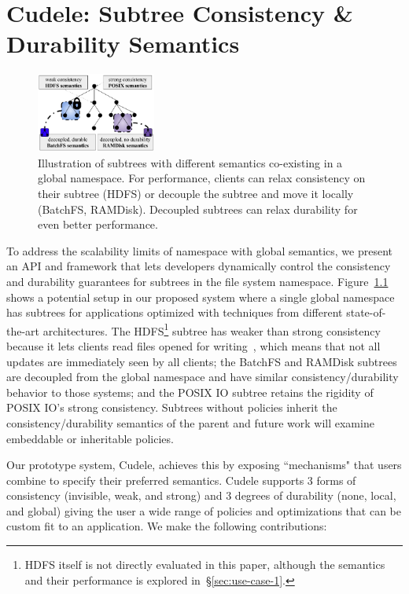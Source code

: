 \chapter{Cudele: Subtree Consistency \& Durability Semantics}
\label{chp:cudele}

\begin{figure}[tb] \centering
\includegraphics[width=0.35\textwidth]{./chapters/cudele/figures/subtree-policies1.png}
\caption{Illustration of subtrees with different semantics co-existing in a
global namespace.  For performance, clients can relax consistency on their
subtree (HDFS) or decouple the subtree and move it locally (BatchFS, RAMDisk).
Decoupled subtrees can relax durability for even better performance.
}\label{fig:subtree-policies} \end{figure}

To address the scalability limits of namespace with global semantics, we
present an API and framework that lets developers dynamically control the
consistency and durability guarantees for subtrees in the file system
namespace.  Figure~\ref{fig:subtree-policies} shows a potential setup in our
proposed system where a single global namespace has subtrees for applications
optimized with techniques from different state-of-the-art architectures.  The
HDFS\footnote{HDFS itself is not directly evaluated in this paper, although the
semantics and their performance is explored in~\S\ref{sec:use-case-1}.} subtree
has weaker than strong consistency because it lets clients read files opened
for writing~\cite{hakimzadeh:dais14-hdfs-consistency}, which means that not all
updates are immediately seen by all clients; the BatchFS and RAMDisk subtrees
are decoupled from the global namespace and have similar consistency/durability
behavior to those systems; and the POSIX IO subtree retains the rigidity of
POSIX IO's strong consistency.  Subtrees without policies inherit the
consistency/durability semantics of the parent and future work will examine
embeddable or inheritable policies.

Our prototype system, Cudele, achieves this by exposing ``mechanisms" that
users combine to specify their preferred semantics.  Cudele supports 3 forms
of consistency (invisible, weak, and strong) and 3 degrees of durability (none,
local, and global) giving the user a wide range of policies and optimizations
that can be custom fit to an application. We make the following contributions:

